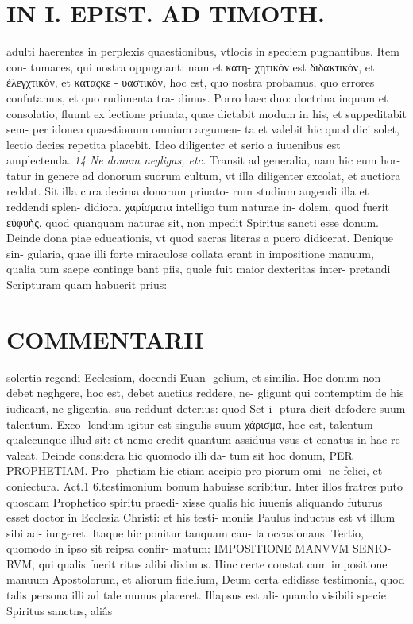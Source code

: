 \documentclass{article}
\begin{document}
\begin{pages}
\section*{IN I. EPIST. AD TIMOTH. }
\marginpar{[ p.111 ]}\pstart adulti haerentes in perplexis quaestionibus, vtlocis in speciem pugnantibus. Item con- tumaces, qui nostra oppugnant: nam et κατη- χητικόν est διδακτικόν, et ἐλεγχτικὸν, et καταςκε - υαστικὸν, hoc est, quo nostra probamus, quo errores confutamus, et quo rudimenta tra- dimus. Porro haec duo: doctrina inquam et consolatio, fluunt ex lectione priuata, quae dictabit modum in his, et suppeditabit sem- per idonea quaestionum omnium argumen- ta et valebit hic quod dici solet, lectio decies repetita placebit. Ideo diligenter et serio a iuuenibus est amplectenda.  \pend
\textit{14  Ne donum negligas, etc. }\pstart Transit ad generalia, nam hic eum hor- tatur in genere ad donorum suorum cultum, vt illa diligenter excolat, et auctiora reddat. Sit illa cura decima donorum priuato- rum studium augendi illa et reddendi splen- didiora. χαρίσματα intelligo tum naturae in- dolem, quod fuerit εὐφυὴς, quod quanquam naturae sit, non mpedit Spiritus sancti esse donum.  \pend\pstart Deinde dona piae educationis, vt quod sacras literas a puero didicerat. Denique sin- gularia, quae illi forte miraculose collata erant in impositione manuum, qualia tum saepe continge bant piis, quale fuit maior dexteritas inter- pretandi Scripturam quam habuerit prius:  \pend
\marginpar{[ p.112 ]}
\section*{COMMENTARII }\pstart solertia regendi Ecclesiam, docendi Euan- gelium, et similia. Hoc donum non debet neghgere, hoc est, debet auctius reddere, ne- gligunt qui contemptim de his iudicant, ne gligentia. sua reddunt deterius: quod Sct i- ptura dicit defodere suum talentum. Exco- lendum igitur est singulis suum χάρισμα, hoc est, talentum qualecunque illud sit: et nemo credit quantum assiduus vsus et conatus in hac re valeat.  \pend\pstart Deinde considera hic quomodo illi da- tum sit hoc donum, PER PROPHETIAM. Pro- phetiam hic etiam accipio pro piorum omi- ne felici, et coniectura. Act.1 6.testimonium bonum habuisse scribitur. Inter illos fratres puto quosdam Prophetico spiritu praedi- xisse qualis hic iuuenis aliquando futurus esset doctor in Ecclesia Christi: et his testi- moniis Paulus inductus est vt illum sibi ad- iungeret. Itaque hic ponitur tanquam cau- la occasionans.  \pend\pstart Tertio, quomodo in ipso sit reipsa confir- matum: IMPOSITIONE MANVVM SENIO- RVM, qui qualis fuerit ritus alibi diximus. Hinc certe constat cum impositione manuum Apostolorum, et aliorum fidelium, Deum certa edidisse testimonia, quod talis persona illi ad tale munus placeret. Illapsus est ali- quando visibili specie Spiritus sanctns, aliâs  \pend

\end{pages}
\end{document}
